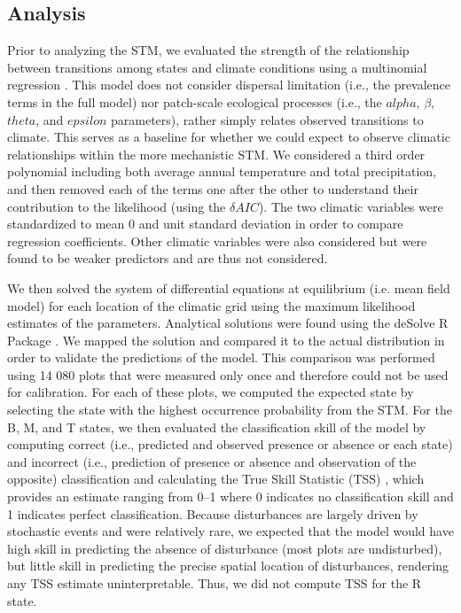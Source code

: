 
\subsection*{Analysis}

Prior to analyzing the STM, we evaluated the strength of the relationship between transitions among
states and climate conditions using a multinomial regression \citep[R package
nnet;][]{Venables2002}. This model does not consider dispersal limitation (i.e., the prevalence
terms in the full model) nor patch-scale ecological processes (i.e., the $alpha$, $\beta$, $theta$,
and $epsilon$ parameters), rather simply relates observed transitions to climate. This serves as a
baseline for whether we could expect to observe climatic relationships within the more mechanistic
STM. We considered a third order polynomial including both average annual temperature and total
precipitation, and then removed each of the terms one after the other to understand their
contribution to the likelihood (using the $\delta AIC$). The two climatic variables were
standardized to mean 0 and unit standard deviation in order to compare regression coefficients.
Other climatic variables were also considered but were found to be weaker predictors and are thus
not considered.

We then solved the system of differential equations at equilibrium (i.e. mean field model) for each
location of the climatic grid using the maximum likelihood estimates of the parameters. Analytical
solutions were found using the deSolve R Package \citep{Soetaert2010}. We mapped the solution and
compared it to the actual distribution in order to validate the predictions of the model. This
comparison was performed using 14 080 plots that were measured only once and therefore could not be
used for calibration. For each of these plots, we computed the expected state by selecting the state
with the highest occurrence probability from the STM.  For the B, M, and T states, we then evaluated
the classification skill of the model by computing correct (i.e., predicted and observed presence or
absence or each state) and incorrect (i.e., prediction of presence or absence and observation of the
opposite) classification and calculating the True Skill Statistic (TSS) \citep{Allouche2006a}, which
provides an estimate ranging from 0--1 where 0 indicates no classification skill and 1 indicates
perfect classification.  Because disturbances are largely driven by stochastic events and were
relatively rare, we expected that the model would have high skill in predicting the absence of
disturbance (most plots are undisturbed), but little skill in predicting the precise spatial
location of disturbances, rendering any TSS estimate uninterpretable. Thus, we did not compute TSS
for the R state.

